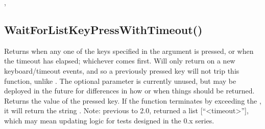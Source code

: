 \documentclass[letterpaper,10pt,english]{sphinxmanual}
\begin{document}
\sphinxAtStartPar
{}

\begin{sphinxVerbatim}[commandchars=\\\{\}]
\PYG{p}{[}\PYG{p}{]}
\end{sphinxVerbatim}

\sphinxAtStartPar
{}

\sphinxAtStartPar
{}, 

\ignorespaces 

\subsection{WaitForListKeyPressWithTimeout()}
\label{\detokenize{reference/peblenvironment:waitforlistkeypresswithtimeout}}\label{\detokenize{reference/peblenvironment:index-80}}
\sphinxAtStartPar
{}

\sphinxAtStartPar
Returns when any one of the keys specified in the   argument is pressed, or when the timeout has elapsed; whichever   comes first. Will only return on a new keyboard/timeout events, and   so a previously pressed key will not trip this function, unlike   .  The optional  parameter is currently   unused, but may be deployed in the future for differences in how   or when things should be returned.  Returns the value of the pressed   key.  If the function terminates by exceeding the ,   it will return the string .  Note: previous to 2.0, returned a list {[}“\textless{}timeout\textgreater{}”{]}, which may mean updating logic for tests designed in the 0.x series.

\sphinxAtStartPar
{}

\begin{sphinxVerbatim}[commandchars=\\\{\}]
\end{sphinxVerbatim}
\end{document}
